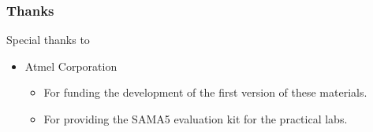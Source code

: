 \begin{frame}
\frametitle{Thanks}
   Special thanks to
   \begin{itemize}
     \item Atmel Corporation \\
     \begin{itemize}
	   \item For funding the development of the first version of
                 these materials.
	   \item For providing the SAMA5 evaluation kit for the 
		 practical labs.
     \end{itemize}
   \end{itemize}
\end{frame}
